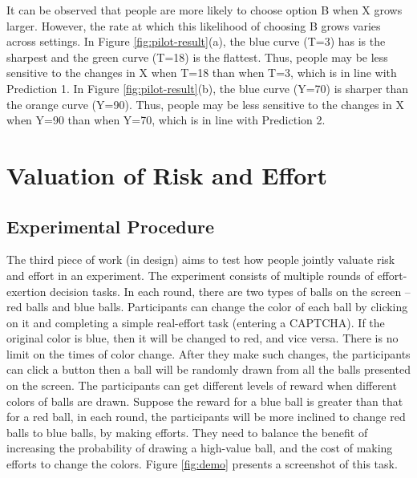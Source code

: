 \documentclass[
  12pt,
]{article}
\begin{document}
It can be observed that people are more likely to choose option B when X
grows larger. However, the rate at which this likelihood of choosing B
grows varies across settings. In Figure \ref{fig:pilot-result}(a), the
blue curve (T=3) has is the sharpest and the green curve (T=18) is the
flattest. Thus, people may be less sensitive to the changes in X when
T=18 than when T=3, which is in line with Prediction 1. In Figure
\ref{fig:pilot-result}(b), the blue curve (Y=70) is sharper than the
orange curve (Y=90). Thus, people may be less sensitive to the changes
in X when Y=90 than when Y=70, which is in line with Prediction 2.

\hypertarget{valuation-of-risk-and-effort}{%
\section{\texorpdfstring{Valuation of Risk and Effort
\label{4}}{Valuation of Risk and Effort }}\label{valuation-of-risk-and-effort}}

\hypertarget{experimental-procedure}{%
\subsection{Experimental Procedure}\label{experimental-procedure}}

The third piece of work (in design) aims to test how people jointly
valuate risk and effort in an experiment. The experiment consists of
multiple rounds of effort-exertion decision tasks. In each round, there
are two types of balls on the screen -- red balls and blue balls.
Participants can change the color of each ball by clicking on it and
completing a simple real-effort task (entering a CAPTCHA). If the
original color is blue, then it will be changed to red, and vice versa.
There is no limit on the times of color change. After they make such
changes, the participants can click a button then a ball will be
randomly drawn from all the balls presented on the screen. The
participants can get different levels of reward when different colors of
balls are drawn. Suppose the reward for a blue ball is greater than that
for a red ball, in each round, the participants will be more inclined to
change red balls to blue balls, by making efforts. They need to balance
the benefit of increasing the probability of drawing a high-value ball,
and the cost of making efforts to change the colors. Figure
\ref{fig:demo} presents a screenshot of this task.
\end{document}
